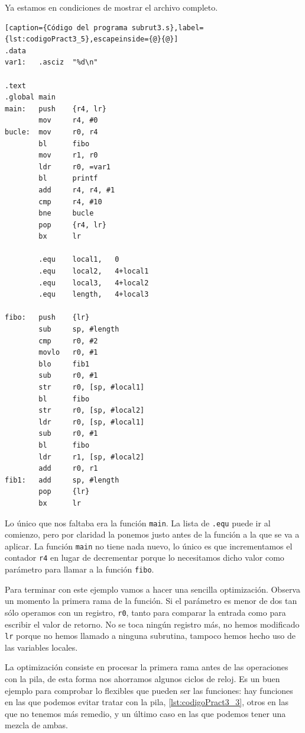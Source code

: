 Ya estamos en condiciones de mostrar el archivo completo.

\begin{lstlisting}[caption={Código del programa subrut3.s},label={lst:codigoPract3_5},escapeinside={@}{@}]
.data
var1:   .asciz  "%d\n"

.text
.global main
main:   push    {r4, lr}
        mov     r4, #0
bucle:  mov     r0, r4
        bl      fibo
        mov     r1, r0
        ldr     r0, =var1
        bl      printf
        add     r4, r4, #1
        cmp     r4, #10
        bne     bucle
        pop     {r4, lr}
        bx      lr

        .equ    local1,   0
        .equ    local2,   4+local1
        .equ    local3,   4+local2
        .equ    length,   4+local3

fibo:   push    {lr}
        sub     sp, #length
        cmp     r0, #2
        movlo   r0, #1
        blo     fib1
        sub     r0, #1
        str     r0, [sp, #local1]
        bl      fibo
        str     r0, [sp, #local2]
        ldr     r0, [sp, #local1]
        sub     r0, #1
        bl      fibo
        ldr     r1, [sp, #local2]
        add     r0, r1
fib1:   add     sp, #length
        pop     {lr}
        bx      lr
\end{lstlisting}

Lo único que nos faltaba era la función {\tt main}. La lista de {\tt .equ} puede
ir al comienzo, pero por claridad la ponemos justo antes de la función a la que
se va a aplicar. La función {\tt main} no tiene nada nuevo, lo único es que incrementamos
el contador {\tt r4} en lugar de decrementar porque lo necesitamos dicho valor como
parámetro para llamar a la función {\tt fibo}.

Para terminar con este ejemplo vamos a hacer una sencilla optimización. Observa un momento
la primera rama de la función. Si el parámetro es menor de dos tan sólo operamos con
un registro, {\tt r0}, tanto para comparar la entrada como para escribir el valor de retorno.
No se toca ningún registro más, no hemos modificado {\tt lr} porque no hemos llamado a ninguna
subrutina, tampoco hemos hecho uso de las variables locales.

La optimización consiste en procesar la primera rama antes de las operaciones con la pila,
de esta forma nos ahorramos algunos ciclos de reloj. Es un buen ejemplo para comprobar
lo flexibles que pueden ser las funciones: hay funciones en las que podemos evitar tratar
con la pila, \ref{lst:codigoPract3_3}, otros en las que no tenemos más remedio, y un último
caso en las que podemos tener una mezcla de ambas.

